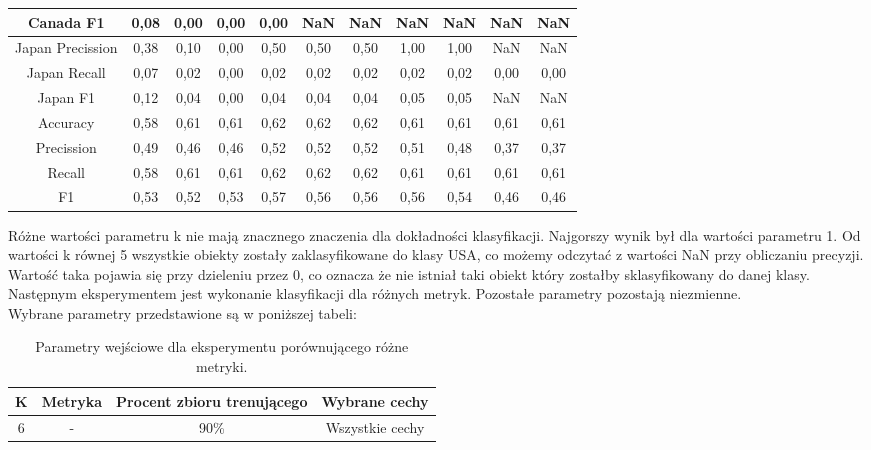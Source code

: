 \documentclass{classrep}
\begin{document}
\begin{table}[h!]
\begin{tabular}{c c c c c c c c c c c}
Canada F1 			& 0,08 & 0,00 & 0,00 & 0,00 & NaN & NaN & NaN &  NaN  & NaN & NaN \\
\hline
Japan Precission 		& 0,38 & 0,10 & 0,00 & 0,50 & 0,50  & 0,50 & 1,00 & 1,00 & NaN & NaN \\
Japan Recall 			& 0,07 & 0,02 & 0,00 & 0,02 & 0,02 & 0,02 & 0,02 & 0,02 & 0,00 & 0,00 \\
Japan F1 				& 0,12 & 0,04 & 0,00 & 0,04 & 0,04  & 0,04 & 0,05 & 0,05 & NaN & NaN\\
\hline
Accuracy 				& 0,58 & 0,61 & 0,61 & 0,62 & 0,62 & 0,62 & 0,61 & 0,61 & 0,61 & 0,61 \\
Precission 				& 0,49 & 0,46 & 0,46 & 0,52 & 0,52  & 0,52 & 0,51 &  0,48  & 0,37 & 0,37\\
Recall 				& 0,58 & 0,61 & 0,61 & 0,62 & 0,62 & 0,62 & 0,61 & 0,61 & 0,61 & 0,61  \\
F1 					& 0,53 & 0,52 & 0,53 & 0,57 & 0,56 & 0,56 & 0,56 & 0,54 & 0,46 & 0,46\\

\end {tabular}
\label {Wyniki klasyfikacji dla różnych wartości parametru k.}
\end{table}

Różne wartości parametru k nie mają znacznego znaczenia dla dokładności klasyfikacji. Najgorszy wynik był dla wartości parametru 1. Od wartości k równej 5 wszystkie obiekty zostały zaklasyfikowane do klasy USA, co możemy odczytać z wartości NaN przy obliczaniu precyzji. Wartość taka pojawia się przy dzieleniu przez 0, co oznacza że nie istniał taki obiekt który zostałby sklasyfikowany do danej klasy. \\



Następnym eksperymentem jest wykonanie klasyfikacji dla różnych metryk. Pozostałe parametry pozostają niezmienne.\\

Wybrane parametry przedstawione są w poniższej tabeli:
 
\begin{table}[h!]
\caption{Parametry wejściowe dla eksperymentu porównującego różne metryki. }
\centering
\vspace{0.1cm}
 \begin{tabular}{c c c c}
    \textbf{K} & \textbf{Metryka}   & \textbf{Procent zbioru trenującego}  & \textbf{Wybrane cechy}   \\
\hline
6 & - & 90\% &  Wszystkie cechy\\
\end {tabular}
\label {Parametry wejściowe dla eksperymentu porównującego różne metryki. }
\end{table}
\end{document}
